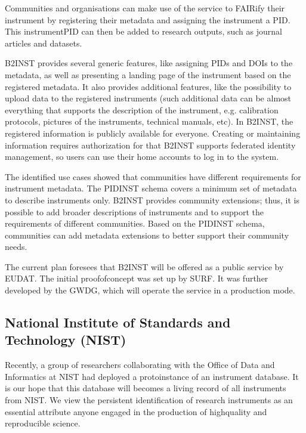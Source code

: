 \documentclass[a4paper,10pt,english]{sphinxmanual}
\begin{document}
\sphinxAtStartPar
Communities and organisations can make use of the service to FAIRify
their instrument by registering their metadata and assigning the
instrument a PID.  This instrument\sphinxhyphen{}PID can then be added to research
outputs, such as journal articles and datasets.

\sphinxAtStartPar
B2INST provides several generic features, like assigning PIDs and DOIs
to the metadata, as well as presenting a landing page of the
instrument based on the registered metadata.  It also provides
additional features, like the possibility to upload data to the
registered instruments (such additional data can be almost everything
that supports the description of the instrument, e.g. calibration
protocols, pictures of the instruments, technical manuals, etc).  In
B2INST, the registered information is publicly available for everyone.
Creating or maintaining information requires authorization \sphinxhyphen{} for that
B2INST supports federated identity management, so users can use their
home accounts to log in to the system.

\sphinxAtStartPar
The identified use cases showed that communities have different
requirements for instrument metadata.  The PIDINST schema covers a
minimum set of metadata to describe instruments only.  B2INST provides
community extensions; thus, it is possible to add broader descriptions
of instruments and to support the requirements of different
communities.  Based on the PIDINST schema, communities can add
metadata extensions to better support their community needs.

\sphinxAtStartPar
The current plan foresees that B2INST will be offered as a public
service by EUDAT.  The initial proof\sphinxhyphen{}of\sphinxhyphen{}concept was set up by SURF.
It was further developed by the GWDG, which will operate the service
in a production mode.


\subsection{National Institute of Standards and Technology (NIST)}
\label{\detokenize{white-paper/adoption:national-institute-of-standards-and-technology-nist}}
\sphinxAtStartPar
Recently, a group of researchers collaborating with the Office of Data
and Informatics at NIST had deployed a proto\sphinxhyphen{}instance of an instrument
database.  It is our hope that this database will becomes a living
record of all instruments from NIST.  We view the persistent
identification of research instruments as an essential attribute
anyone engaged in the production of high\sphinxhyphen{}quality and reproducible
science.
\end{document}
